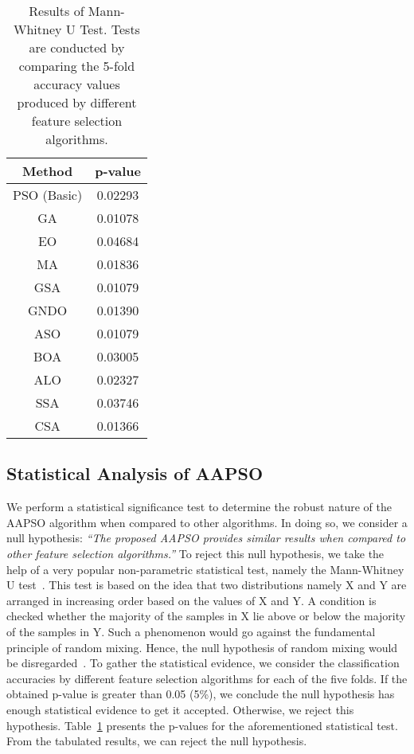 \documentclass[final,3p,times]{elsarticle}
\begin{document}
\begin{table}[ht!]
    \centering
    \caption{Results of Mann-Whitney U Test. Tests are conducted by comparing the 5-fold accuracy values produced by different feature selection algorithms.}
    \begin{tabular}{c|c}
    
    \toprule
      Method & p-value\\
      \midrule
      PSO (Basic) & 0.02293\\ 
      GA & 0.01078\\
      EO & 0.04684\\
      MA & 0.01836\\
      GSA & 0.01079\\
      GNDO & 0.01390\\
      ASO & 0.01079\\
      BOA & 0.03005\\
      ALO & 0.02327\\
      SSA & 0.03746\\
      CSA & 0.01366\\
      \bottomrule
    \end{tabular}
    \label{tab:stat_test}
\end{table}
\subsection{Statistical Analysis of AAPSO}
{We} perform a statistical significance test to determine the robust nature of the {AAPSO} algorithm when compared to other algorithms. In doing so, we consider a null hypothesis: \textit{“The proposed AAPSO provides similar results when compared to other feature selection algorithms.”} To reject this null {hypothesis}, we take the help of a very popular non-parametric statistical test, namely the Mann-Whitney U test~\cite{perez2015improving}. This test is based on the idea that two distributions namely X and Y are arranged in increasing order based on the values of X and Y. A condition is checked whether the majority of the samples in X lie above or below the majority of the samples in Y. Such a phenomenon would go against the fundamental principle of random mixing. {Hence,} the null hypothesis of random mixing would be disregarded~\cite{perez2015improving}. To gather the statistical evidence, we {consider} the classification accuracies by different feature selection algorithms for each of the five folds. If the obtained p-value is {greater} than 0.05 (5\%), we conclude the null hypothesis has enough statistical evidence to {get it accepted. Otherwise,} we reject this hypothesis. Table~\ref{tab:stat_test} presents the p-values for the aforementioned statistical test. From the tabulated results, we can reject the null hypothesis.
\end{document}
